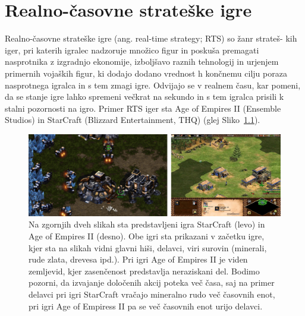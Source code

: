 \documentclass[a4paper, 12pt]{book}
\begin{document}
\chapter{Realno-časovne strateške igre}
\label{chrts}

Realno-časovne strateške igre (ang. real-time strategy; RTS) so žanr strateš- kih iger, pri katerih igralec nadzoruje množico figur in poskuša premagati nasprotnika z izgradnjo ekonomije, izboljšavo raznih tehnologij in urjenjem primernih vojaških figur, ki dodajo dodano vrednost h končnemu cilju poraza nasprotnega igralca in s tem zmagi igre.
Odvijajo se v realnem času, kar pomeni, da se stanje igre lahko spremeni večkrat na sekundo in s tem igralca prisili k stalni pozornosti na igro.
Primer RTS iger sta Age of Empires II (Ensemble Studios) in StarCraft (Blizzard Entertainment, THQ) (glej Sliko~{\ref{picRtsGames}}). 

\begin{figure}[h!]
	\begin{center}
		\includegraphics[width=1.0\textwidth]{photos/horizontal_rts.pdf}
	\end{center}
	\caption{Na zgornjih dveh slikah sta predstavljeni igra StarCraft (levo) in Age of Empires II (desno). 
		Obe igri sta prikazani v začetku igre, kjer sta na slikah vidni glavni hiši, delavci, viri surovin (minerali, rude zlata, drevesa ipd.).
		Pri igri Age of Empires II je viden zemljevid, kjer zasenčenost predstavlja neraziskani del. 
		Bodimo pozorni, da izvajanje določenih akcij poteka več časa, saj na primer delavci pri igri StarCraft vračajo mineralno rudo več časovnih enot, pri igri Age of Empiress II pa se več časovnih enot urijo delavci.}
	\label{picRtsGames}
\end{figure}
\end{document}
